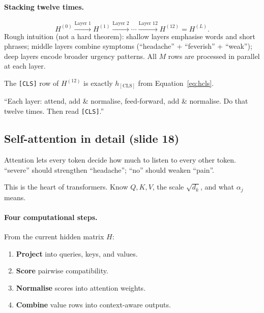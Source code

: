 \paragraph{Stacking twelve times.}
\[
  H^{(0)} \xrightarrow{\text{Layer 1}} H^{(1)} \xrightarrow{\text{Layer 2}} \cdots \xrightarrow{\text{Layer 12}} H^{(12)} = H^{(L)}.
\]
Rough intuition (not a hard theorem): shallow layers emphasise words and short phrases;
middle layers combine symptoms (``headache'' + ``feverish'' + ``weak'');
deep layers encode broader urgency patterns. All \(M\) rows are processed in parallel at each layer.

\begin{remark}
The \texttt{[CLS]} row of \(H^{(12)}\) is exactly \(h_{\mathrm{[CLS]}}\) from Equation~\eqref{eq:hcls}.
\end{remark}

\begin{saybox}
``Each layer: attend, add \& normalise, feed-forward, add \& normalise. Do that twelve times. Then read \texttt{[CLS]}.''
\end{saybox}

\subsection{Self-attention in detail (slide 18)}
\label{sec:expl-attn}

\begin{intuitbox}
Attention lets every token decide how much to listen to every other token.
``severe'' should strengthen ``headache''; ``no'' should weaken ``pain''.
\end{intuitbox}

\begin{whybox}
This is the heart of transformers. Know \(Q,K,V\), the scale \(\sqrt{d_k}\), and what \(\alpha_j\) means.
\end{whybox}

\paragraph{Four computational steps.}
From the current hidden matrix \(H\):
\begin{enumerate}
  \item \textbf{Project} into queries, keys, and values.
  \item \textbf{Score} pairwise compatibility.
  \item \textbf{Normalise} scores into attention weights.
  \item \textbf{Combine} value rows into context-aware outputs.
\end{enumerate}

